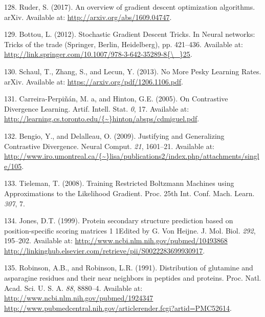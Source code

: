 \documentclass[12pt,a4paper,twoside]{book}
\theoremstyle{definition}
\theoremstyle{definition}
\theoremstyle{remark}
\begin{document}
\hypertarget{ref-Ruder2017}{}
128. Ruder, S. (2017). An overview of gradient descent optimization
algorithms. arXiv. Available at: \url{http://arxiv.org/abs/1609.04747}.

\hypertarget{ref-Bottou2012}{}
129. Bottou, L. (2012). Stochastic Gradient Descent Tricks. In Neural
networks: Tricks of the trade (Springer, Berlin, Heidelberg), pp.
421--436. Available at:
\href{http://link.springer.com/10.1007/978-3-642-35289-8\%7B/_\%7D25}{http://link.springer.com/10.1007/978-3-642-35289-8\{\textbackslash{}\_\}25}.

\hypertarget{ref-Schaul2013}{}
130. Schaul, T., Zhang, S., and Lecun, Y. (2013). No More Pesky Learning
Rates. arXiv. Available at: \url{https://arxiv.org/pdf/1206.1106.pdf}.

\hypertarget{ref-Carreira-Perpinan2005}{}
131. Carreira-Perpiñán, M. a, and Hinton, G.E. (2005). On Contrastive
Divergence Learning. Artif. Intell. Stat. \emph{0}, 17. Available at:
\href{http://learning.cs.toronto.edu/\%7B~\%7Dhinton/absps/cdmiguel.pdf}{http://learning.cs.toronto.edu/\{\textasciitilde{}\}hinton/absps/cdmiguel.pdf}.

\hypertarget{ref-Bengio2009}{}
132. Bengio, Y., and Delalleau, O. (2009). Justifying and Generalizing
Contrastive Divergence. Neural Comput. \emph{21}, 1601--21. Available
at:
\href{http://www.iro.umontreal.ca/\%7B~\%7Dlisa/publications2/index.php/attachments/single/105}{http://www.iro.umontreal.ca/\{\textasciitilde{}\}lisa/publications2/index.php/attachments/single/105}.

\hypertarget{ref-Tieleman2008}{}
133. Tieleman, T. (2008). Training Restricted Boltzmann Machines using
Approximations to the Likelihood Gradient. Proc. 25th Int. Conf. Mach.
Learn. \emph{307}, 7.

\hypertarget{ref-Jones1999}{}
134. Jones, D.T. (1999). Protein secondary structure prediction based on
position-specific scoring matrices 1 1Edited by G. Von Heijne. J. Mol.
Biol. \emph{292}, 195--202. Available at:
\href{http://www.ncbi.nlm.nih.gov/pubmed/10493868\%20http://linkinghub.elsevier.com/retrieve/pii/S0022283699930917}{http://www.ncbi.nlm.nih.gov/pubmed/10493868 http://linkinghub.elsevier.com/retrieve/pii/S0022283699930917}.

\hypertarget{ref-Robinson1991}{}
135. Robinson, A.B., and Robinson, L.R. (1991). Distribution of
glutamine and asparagine residues and their near neighbors in peptides
and proteins. Proc. Natl. Acad. Sci. U. S. A. \emph{88}, 8880--4.
Available at:
\href{http://www.ncbi.nlm.nih.gov/pubmed/1924347\%20http://www.pubmedcentral.nih.gov/articlerender.fcgi?artid=PMC52614}{http://www.ncbi.nlm.nih.gov/pubmed/1924347 http://www.pubmedcentral.nih.gov/articlerender.fcgi?artid=PMC52614}.
\end{document}
